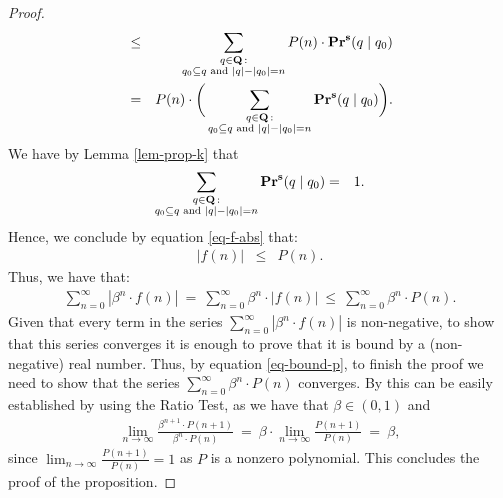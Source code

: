 \begin{proof}
\begin{eqnarray}
\notag
& \leq & \sum_{\substack{q \in \mathbf{Q} \,: \\ q_0 \subseteq q \text{ {\rm and} } |q| - |q_0| = n}} P(n) \cdot \mathbf{Pr}^{\mathbf{s}}(q \mid q_0)\\
\label{eq-f-abs}
& = & P(n) \cdot \bigg(\sum_{\substack{q \in \mathbf{Q} \,: \\ q_0 \subseteq q \text{ {\rm and} } |q| - |q_0| = n}} \mathbf{Pr}^{\mathbf{s}}(q \mid q_0)\bigg).
\end{eqnarray}
We have by Lemma \ref{lem-prop-k} that
\begin{eqnarray*}
\sum_{\substack{q \in \mathbf{Q} \,: \\ q_0 \subseteq q \text{ {\rm and} } |q| - |q_0| = n}} \mathbf{Pr}^{\mathbf{s}}(q \mid q_0) & = & 1.
\end{eqnarray*}
Hence, we conclude by equation \eqref{eq-f-abs} that:
\begin{eqnarray*}
|f(n)| & \leq & P(n).
\end{eqnarray*}
Thus, we have that:
\begin{eqnarray}\label{eq-bound-p}
\sum_{n=0}^\infty |\beta^n \cdot f(n)| \ = \ \sum_{n=0}^\infty \beta^n \cdot |f(n)|
\ \leq \ \sum_{n=0}^\infty \beta^n \cdot P(n).
\end{eqnarray}
Given that every term in the series $\sum_{n=0}^\infty |\beta^n \cdot f(n)|$ is non-negative, to show that this series converges it is enough to prove that it is bound by a (non-negative) real number. Thus, by equation \eqref{eq-bound-p}, to finish the proof we need to show that the series $\sum_{n=0}^\infty \beta^n \cdot P(n)$ converges. By this can be easily established by using the Ratio Test, as we have that $\beta \in (0,1)$ and
\begin{eqnarray*}
\lim_{n \to \infty} \frac{\beta^{n+1} \cdot P(n+1)}{\beta^{n} \cdot P(n)} \ = \ \beta \cdot \lim_{n \to \infty} \frac{P(n+1)}{P(n)}
\ = \ \beta,
\end{eqnarray*}
since $\lim_{n \to \infty} \frac{P(n+1)}{P(n)} = 1$ as $P$ is a nonzero polynomial.
This concludes the proof of the proposition.
\end{proof}

